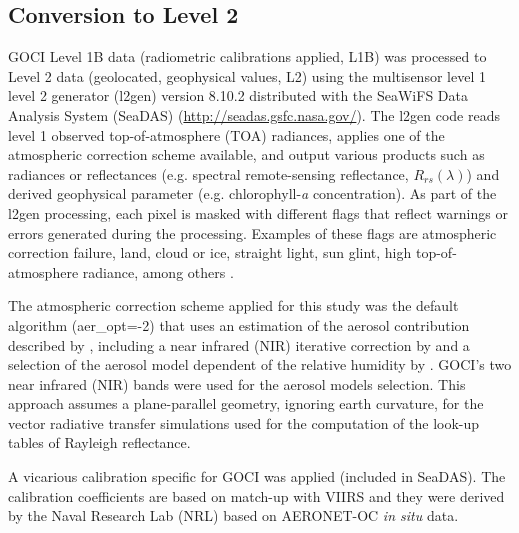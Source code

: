 \documentclass[onecolumn,3p,letterpaper,11pt]{elsarticle}
\begin{document}
\subsection{Conversion to Level 2}
GOCI Level 1B data (radiometric calibrations applied, L1B) was processed to Level 2 data (geolocated, geophysical values, L2) using the multisensor level 1 level 2 generator (l2gen) version 8.10.2 distributed with the SeaWiFS Data Analysis System (SeaDAS) (\url{http://seadas.gsfc.nasa.gov/}). The l2gen code reads level 1 observed top-of-atmosphere (TOA) radiances, applies one of the atmospheric correction scheme available, and output various products such as radiances or reflectances (e.g.  spectral remote-sensing reflectance, $R_{rs}(\lambda)$) and derived geophysical parameter (e.g. chlorophyll-{\it a} concentration). As part of the l2gen processing, each pixel is masked with different flags that reflect warnings or errors generated during the processing. Examples of these flags are atmospheric correction failure, land, cloud or ice, straight light, sun glint, high top-of-atmosphere radiance, among others \citep{Bailey2006}. 

The atmospheric correction scheme applied for this study was the default algorithm ({\ttfamily aer\_opt=-2}) that uses an estimation of the aerosol contribution described by \citet{Gordon1994}, including a near infrared (NIR) iterative correction by \citet{Bailey2010} and a selection of the aerosol model dependent of the relative humidity by \citet{Ahmad2010}. GOCI's two near infrared (NIR) bands were used for the aerosol models selection. This approach assumes a plane-parallel geometry, ignoring earth curvature, for the vector radiative transfer simulations used for the computation of the look-up tables of Rayleigh reflectance.  

A vicarious calibration specific for GOCI was applied (included in SeaDAS). The calibration coefficients are based on match-up with VIIRS and they were derived by the Naval Research Lab (NRL) based on AERONET-OC {\it in situ} data.
\end{document}

